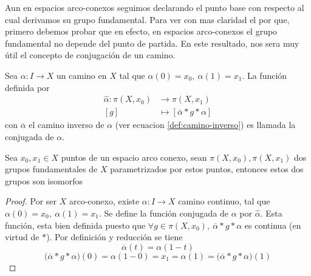 {Aun en espacios arco-conexos seguimos declarando el punto base con
respecto al cual derivamos su grupo fundamental. Para ver con mas
claridad el por que, primero debemos probar que en efecto, en espacios
arco-conexos el grupo fundamental no depende del punto de partida. En
este resultado, nos sera muy útil el concepto de conjugación de un
camino.
\begin{definicion} \label{def:conjugada}
  Sea \(\alpha : I \to X\) un camino en \(X\) tal que \(\alpha (0) =
  x_0,\ \alpha(1) = x_1\). La función definida por
  \begin{align*}
    \hat \alpha : \pi (X, x_0) &\longrightarrow \pi (X, x_1) \\
    [g] &\longmapsto [ \overline{\alpha} * g * \alpha ]
  \end{align*}
  con \(\overline \alpha\) el camino inverso de \(\alpha\) (ver ecuacion
  \eqref{def:camino-inverso}) es llamada la conjugada de \(\alpha\).
\end{definicion}
\begin{teorema} \label{not:alpha-hat}
  Sea \(x_0 , x_1 \in X\) puntos de un espacio arco conexo, sean \(\pi
  (X, x_0), \pi (X, x_1)\) dos grupos fundamentales de \(X\)
  parametrizados por estos puntos, entonces estos dos grupos son isomorfos
\end{teorema}
\begin{proof}
  Por ser \(X\) arco-conexo, existe \(\alpha : I \to X\) camino
  continuo, tal que \(\alpha (0) = x_0,\ \alpha (1) = x_1\). Se define
  la función conjugada de \(\alpha\) por \(\hat \alpha\).
  Esta función, esta bien definida puesto que \(\forall g \in \pi (X,
  x_0),\ \overline{\alpha} * g * \alpha \) es continua (en virtud de \(*\)).
  Por definición y reducción se tiene
  \[ \overline{\alpha} (t) = \alpha (1 - t)\]
  \[\big(\overline{\alpha} * g * \alpha \big) (0) = \alpha (1 - 0) = x_1
    = \alpha (1) = \big(\overline{\alpha} * g * \alpha \big) (1)\]


\end{proof}}
